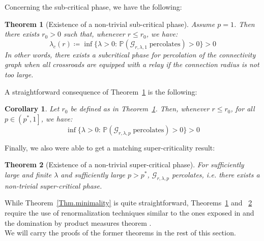 \documentclass[10pt,a4paper]{amsart}
\theoremstyle{exampstyle}
\newtheorem{Theorem}{Theorem}
\newtheorem{Corollary}{Corollary}
\theoremstyle{exampnotations}
\begin{document}
Concerning the sub-critical phase, we have the following:
\begin{Theorem}[Existence of a non-trivial sub-critical phase]
\label{Thm.subcritical}
Assume $p=1$. Then there exists $r_{0} > 0$ such that, whenever $r \leq r_0$, we have:
\begin{equation*}
    \lambda_c(r) \coloneqq \inf \lbrace \lambda > 0 : \, \mathbb{P}(\mathcal{G}_{r, \lambda, 1} \; \text{percolates}) > 0 \rbrace > 0
\end{equation*}
In other words, there exists a subcritical phase for percolation of the connectivity graph when all crossroads are equipped with a relay if the connection radius is not too large.
\end{Theorem}

A straightforward consequence of Theorem~\ref{Thm.subcritical} is the following:

\begin{Corollary}
\label{Coroll.subcritical}
Let $r_0$ be defined as in Theorem~\ref{Thm.subcritical}. Then, whenever $r \leq r_{0}$, for all $p \in \left(p^*,1\right]$, we have:
\begin{equation*}
    \inf \lbrace \lambda > 0 : \, \mathbb{P}(\mathcal{G}_{r, \lambda, p} \; \text{percolates}) > 0 \rbrace > 0
\end{equation*}
\end{Corollary}

Finally, we also were able to get a matching super-criticality result:

\begin{Theorem}[Existence of a non-trivial super-critical phase]
\label{Thm.supercritical}
For sufficiently large and finite $\lambda$ and sufficiently large $p > p^*$, $\mathcal{G}_{r,\lambda,p}$ percolates, i.e. there exists a non-trivial super-critical phase.
\end{Theorem}

While Theorem~\ref{Thm.minimality} is quite straightforward, Theorems~\ref{Thm.subcritical} and ~\ref{Thm.supercritical} require the use of renormalization techniques similar to the ones exposed in \cite{hirsch_continuum_2017} and the domination by product measures theorem \cite[Theorem 0.0]{liggett_domination_1997}. \\
We will carry the proofs of the former theorems in the rest of this section.
\end{document}
